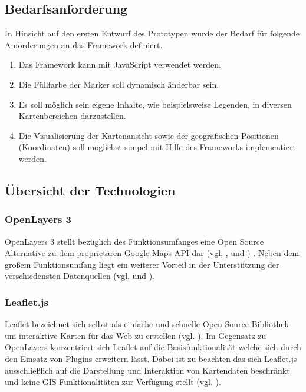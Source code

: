 \documentclass[../Bachelorarbeit.tex]{subfiles}
\begin{document}
\subsection{Bedarfsanforderung}
\label{Bedarf}
In Hinsicht auf den ersten Entwurf des Prototypen wurde der Bedarf für folgende Anforderungen an das Framework definiert.
\begin{enumerate}
	\item Das Framework kann mit JavaScript verwendet werden.
	\item Die Füllfarbe der Marker soll dynamisch änderbar sein.
	\item Es soll möglich sein eigene Inhalte,  wie beispielsweise Legenden, in diversen Kartenbereichen darzustellen.
	\item Die Visualisierung der Kartenansicht sowie der geografischen Positionen (Koordinaten) soll möglichst simpel mit Hilfe des Frameworks implementiert werden.
\end{enumerate}
 
\subsection{Übersicht der Technologien}

\subsubsection{OpenLayers 3}
OpenLayers 3 stellt bezüglich des Funktionsumfanges eine Open Source Alternative zu dem proprietären Google Maps \ac{API} dar (vgl. \cite{OpenlayersInfoSheet}, und \cite{VergleichApi}) .
Neben dem großem Funktionsumfang liegt ein weiterer Vorteil in der Unterstützung der verschiedensten Datenquellen (vgl. \cite{Openlayers} und \cite[Abschnitt: Data Sources]{OpenlayersInfoSheet}). 

\subsubsection{Leaflet.js}
Leaflet bezeichnet sich selbst als einfache und schnelle Open Source Bibliothek um interaktive Karten für das Web zu erstellen (vgl. \cite{Leaflet}). 
Im Gegensatz zu OpenLayers konzentriert sich Leaflet auf die Basisfunktionalität welche sich durch den Einsatz von Plugins erweitern lässt.
Dabei ist zu beachten das sich Leaflet.js ausschließlich auf die Darstellung und Interaktion von Kartendaten beschränkt und keine \ac{GIS}-Funktionalitäten zur Verfügung stellt (vgl. \cite[Abschnitt: What Leaflet does not do]{LeafletMakeAMap}). 
\end{document}
